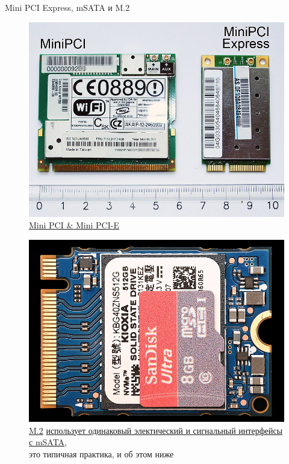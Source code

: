 \documentclass[xetex,aspectratio=43]{beamer}
\begin{document}
\begin{frame}{Mini PCI Express, mSATA и M.2}
    \begin{figure}
        \includegraphics[height=0.35\textheight]{img/04.MiniPCI_and_MiniPCI_Express_cards.jpg}
        \caption{\href{https://en.wikipedia.org/wiki/PCI_Express\#MINI-CARD}{Mini PCI \& Mini PCI-E}}
    \end{figure}
    \begin{figure}
        \includegraphics[height=0.25\textheight]{img/04.M.2_Carg.jpg}
        \caption{\href{https://en.wikipedia.org/wiki/M.2\#Form_factors_and_keying}{M.2}
        \href{https://en.wikipedia.org/wiki/M.2\#/media/File:SATA_Express_interface.svg}{использует одинаковый электический и сигнальный интерфейсы с mSATA},\\это типичная практика, и об этом ниже
        }
    \end{figure}
\end{frame}
\end{document}
